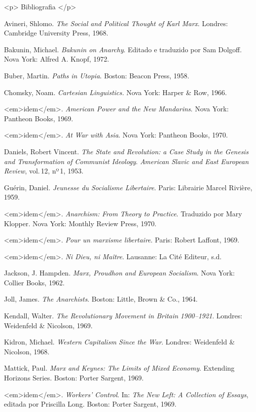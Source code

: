 <p> Bibliografia </p>

{Avineri}, Shlomo. \textit{The Social and Political Thought of Karl
Marx}. Londres: Cambridge University Press, 1968.

{Bakunin}, Michael. \textit{Bakunin on Anarchy}. Editado e traduzido por
Sam Dolgoff. Nova York: Alfred A. Knopf, 1972.

{Buber}, Martin. \textit{Paths in Utopia}. Boston: Beacon Press, 1958. 

{Chomsky}, Noam. \textit{Cartesian Linguistics.} Nova York: Harper \&
Row, 1966. 

<em>idem</em>. \textit{American Power and the New Mandarins}. Nova York:
Pantheon Books, 1969.

<em>idem</em>. \textit{At War with Asia}. Nova York: Pantheon Books, 1970. 

{Daniels}, Robert Vincent. \textit{The State and Revolution: a Case
Study in the Genesis and Transformation of Communist Ideology}.
\textit{American Slavic and East European Review}, vol.\,12,
nº\,1, 1953.

{Guérin}, Daniel. \textit{Jeunesse du Socialisme Libertaire}. Paris:
Librairie Marcel Rivière, 1959.

<em>idem</em>. \textit{Anarchism: From Theory to Practice}. Traduzido por Mary
Klopper. Nova York: Monthly Review Press, 1970.

<em>idem</em>. \textit{Pour un marxisme libertaire}. Paris: Robert Laffont,
1969. 

<em>idem</em>. \textit{Ni Dieu, ni Maître}. Lausanne: La Cité Editeur, s.d. 

{Jackson}, J. Hampden. \textit{Marx, Proudhon and European Socialism}.
Nova York: Collier Books, 1962.

{Joll}, James. \textit{The Anarchists}. Boston: Little, Brown \& Co.,
1964. 

{Kendall}, Walter. \textit{The Revolutionary Movement in
Britain} \textit{1900--1921}. Londres: Weidenfeld \& Nicolson, 1969.

{Kidron}, Michael. \textit{Western Capitalism Since the War}. Londres:
Weidenfeld \& Nicolson, 1968.

{Mattick}, Paul. \textit{Marx and Keynes: The Limits of Mixed Economy}.
Extending Horizons Series. Boston: Porter Sargent, 1969.

<em>idem</em>. \textit{Workers’ Control}. In: \textit{The New Left: A Collection
of Essays}, editada por Priscilla Long. Boston: Porter Sargent, 1969.

